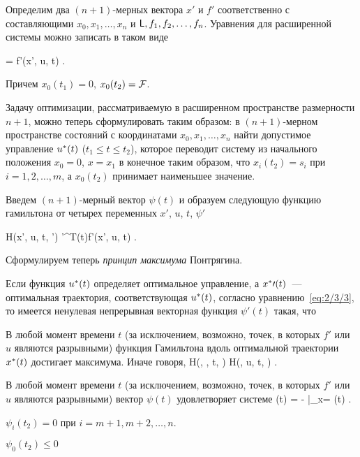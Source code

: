 Определим два $(n+1)$-мерных вектора $x'$ и $f'$ соответственно с составляющими $x_0, x_1, \ldots, x_n$ и $\mathsf{L}, f_1, f_2, \ldots, f_n$. Уравнения для расширенной системы можно записать в таком виде

     = f'(x', u, t) \mbox{.}
\eeq

Причем $x_0(t_1) = 0$, $x_0(t_2) = \mathcal{F}$.

Задачу оптимизации, рассматриваемую в расширенном пространстве размерности $n+1$, можно теперь сформулировать таким образом: в $(n+1)$-мерном пространстве состояний с координатами $x_0, x_1, \ldots, x_n$ найти допустимое управление $u^{*}(t)$ ($t_1 \leqslant t \leqslant t_2$), которое переводит систему из начального положения $x_0 = 0$, $x = x_1$ в конечное таким образом, что $x_i(t_2) = s_i$ при $i = 1, 2, \ldots, m$, а $x_0(t_2)$ принимает наименьшее значение.

Введем $(n+1)$-мерный вектор $\psi(t)$ и образуем следующую функцию гамильтона от четырех переменных $x'$, $u$, $t$, $\psi'$

    H(x', u, t, \psi') \eqdef \psi'^T(t)f'(x', u, t) \mbox{.}
\eeq

Сформулируем теперь \emph{принцип максимума} Понтрягина.

\begin{teo}
	Если функция $u^{*}(t)$ определяет оптимальное управление, а $x^{*}\prime(t)$~--- оптимальная траектория, соответствующая $u^{*}(t)$, согласно уравнению~\ref{eq:2/3/3}, то имеется ненулевая непрерывная векторная функция $\psi\prime(t)$ такая, что
	\benum
		\item
			В любой момент времени $t$ (за исключением, возможно, точек, в которых $f'$ или $u$ являются разрывными) функция Гамильтона вдоль оптимальной траектории $x^{*}(t)$ достигает максимума. Иначе говоря,
			\beqn
				H(\optX\prime, \optU, t, \psi\prime) \geqslant H(\optX\prime, u, t, \psi\prime) \mbox{.}
			\eeqn
		
		\item
			В любой момент времени $t$ (за исключением, возможно, точек, в которых $f'$ или $u$ являются разрывными) вектор $\psi(t)$ удовлетворяет системе
			\beq{eq:2/3/5}
				\dot{\psi}\prime(t) = - \biggm|_{x\prime = \optX(t)} \mbox{.}
			\eeq
		
		\item
			$\psi_i(t_2) = 0$ при $i= m+1, m+2, \ldots, n$.
		
		\item
			$\psi_0(t_2) \leqslant 0$
	\eenum
\end{teo}

